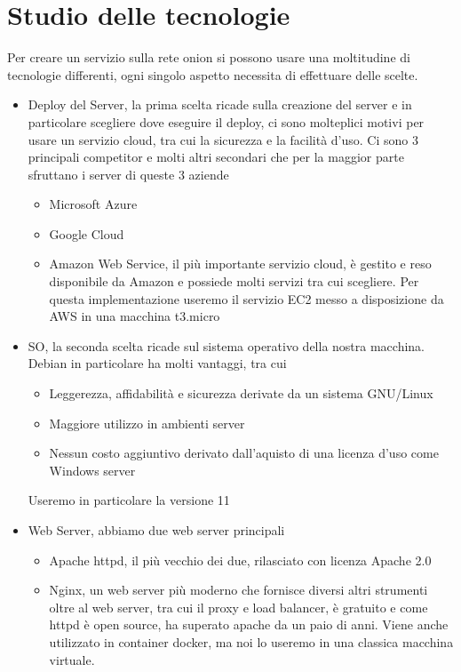\section{Studio delle tecnologie}

Per creare un servizio sulla rete onion si possono usare una moltitudine di tecnologie differenti, ogni singolo aspetto necessita di effettuare delle scelte. \\
\begin{itemize}
    \item Deploy del Server, la prima scelta ricade sulla creazione del server e in particolare scegliere dove eseguire il deploy, ci sono molteplici motivi per usare un servizio cloud, tra cui la sicurezza e la facilità d'uso. Ci sono 3 principali competitor e molti altri secondari che per la maggior parte sfruttano i server di queste 3 aziende
    \begin{itemize}
        \item Microsoft Azure
        \item Google Cloud
        \item Amazon Web Service, il più importante servizio cloud, è gestito e reso disponibile da Amazon e possiede molti servizi tra cui scegliere. Per questa implementazione useremo il servizio EC2 messo a disposizione da AWS in una macchina t3.micro
    \end{itemize}
    \item SO, la seconda scelta ricade sul sistema operativo della nostra macchina. Debian in particolare ha molti vantaggi, tra cui 
    \begin{itemize}
        \item Leggerezza, affidabilità e sicurezza derivate da un sistema GNU/Linux
        \item Maggiore utilizzo in ambienti server
        \item Nessun costo aggiuntivo derivato dall'aquisto di una licenza d'uso come Windows server
    \end{itemize}
    Useremo in particolare la versione 11
    \item Web Server, abbiamo due web server principali 
    \begin{itemize}
        \item Apache httpd, il più vecchio dei due, rilasciato con licenza Apache 2.0
        \item Nginx, un web server più moderno che fornisce diversi altri strumenti oltre al web server, tra cui il proxy e load balancer, è gratuito e come httpd è open source, ha superato apache da un paio di anni. Viene anche utilizzato in container docker, ma noi lo useremo in una classica macchina virtuale.
    \end{itemize}
\end{itemize}



